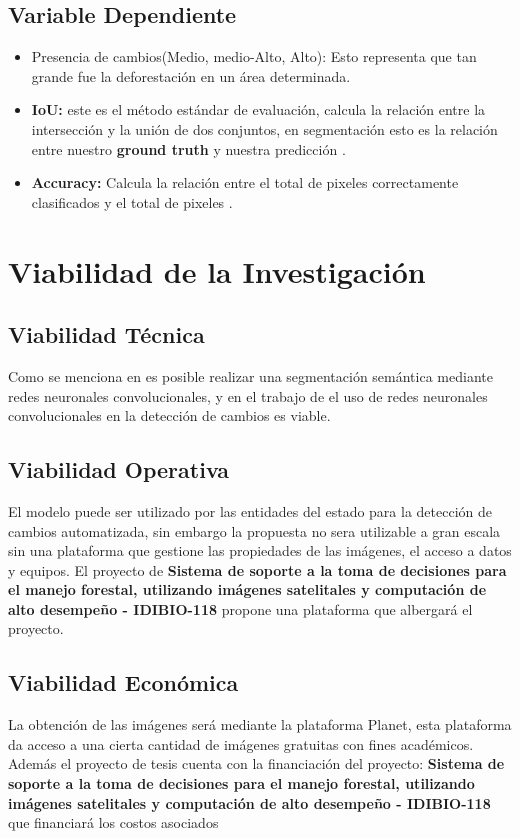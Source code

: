 \subsection{Variable Dependiente}
\begin{itemize}
    \item Presencia de cambios(Medio, medio-Alto, Alto): Esto representa que tan grande fue la deforestación en un área determinada.

    \item \textbf{IoU:} este es el método estándar de evaluación, calcula la relación entre la intersección y la unión de dos conjuntos, en segmentación esto es la relación entre nuestro \textbf{ground truth} y nuestra predicción \cite{GarciaGarcia2017}.
    \item \textbf{Accuracy:} Calcula la relación entre el total de pixeles correctamente clasificados y el total de pixeles \cite{GarciaGarcia2017}.
    
\end{itemize}{}

\section{Viabilidad de la Investigación}
\subsection{Viabilidad Técnica}
Como se menciona en \cite{long2015fully} es posible realizar una segmentación semántica mediante redes neuronales convolucionales, y  en el trabajo de \cite{Doshi2018} el uso de redes neuronales convolucionales en la detección de cambios es viable. 

\subsection{Viabilidad Operativa}
El modelo puede ser utilizado por las entidades del estado para la detección de cambios automatizada, sin embargo la propuesta no sera utilizable a gran escala sin una plataforma que gestione las propiedades de las imágenes, el acceso a datos y equipos. El proyecto de \textbf{Sistema de soporte a la toma de decisiones para el manejo forestal, utilizando imágenes satelitales y computación de alto desempeño - IDIBIO-118} propone una plataforma que albergará el proyecto.


\subsection{Viabilidad Económica}
La obtención de las imágenes será mediante la plataforma Planet, esta plataforma da acceso a una cierta cantidad de imágenes gratuitas con fines académicos. Además el proyecto de tesis cuenta con la financiación del proyecto: \textbf{Sistema de soporte a la toma de decisiones para el manejo forestal, utilizando imágenes satelitales y computación de alto desempeño - IDIBIO-118} que financiará los costos asociados




